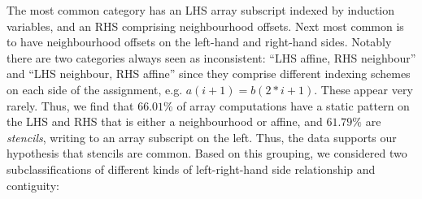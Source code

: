 \begin{center}
\begin{tabular}{ll|S[table-format=4]S[table-format=2.2]S[table-format=4]S[table-format=2.2]c}
\end{tabular}
\end{center}
%
The most common category has an LHS array subscript
indexed by induction variables, and an RHS comprising
neighbourhood offsets. Next most common is to have neighbourhood
offsets on the left-hand and right-hand sides. Notably
there are two categories always seen as inconsistent:
``LHS affine, RHS neighbour'' and ``LHS neighbour, RHS affine''
since they comprise different indexing schemes
on each side of the assignment, e.g. $a(i + 1) = b(2*i + 1)$. These
appear very rarely. Thus, we find that $66.01\%$ of array computations
have a static pattern on the LHS and RHS that is either
a neighbourhood or affine, and $61.79\%$ are \emph{stencils},
writing to an array subscript on the left. Thus, the data supports our
hypothesis that stencils are common. Based on this grouping, we
considered two subclassifications of different kinds of
left-right-hand side relationship and contiguity:
